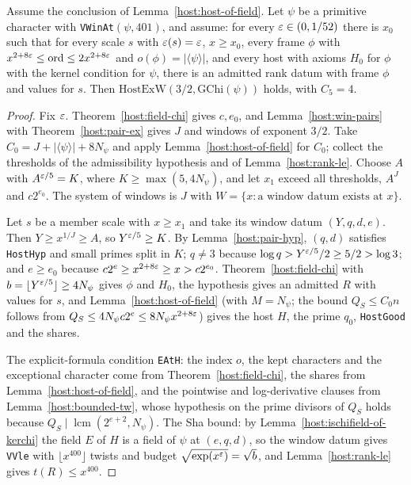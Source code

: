 \begin{theorem}\label{host:supply-of-adm-of}
Assume the conclusion of Lemma~\ref{host:host-of-field}. Let $\psi$ be a
primitive character with \texttt{VWinAt}$(\psi,401)$, and assume: for every
$\varepsilon\in(0,1/52)$ there is $x_0$ such that for every scale $s$ with
$\varepsilon(s)=\varepsilon$, $x\ge x_0$, every frame $\phi$ with
$x^{2+8\varepsilon}\le\mathrm{ord}\le2x^{2+8\varepsilon}$ and $o(\phi)=|\langle\psi
\rangle|$, and every host with axioms $H_0$ for $\phi$ with the kernel
condition for $\psi$, there is an admitted rank datum with frame $\phi$ and
values for $s$. Then $\mathrm{HostExW}(3/2,\mathrm{GChi}(\psi))$ holds, with
$C_5=4$.
\end{theorem}
\begin{proof}
Fix $\varepsilon$. Theorem~\ref{host:field-chi} gives $c,e_0$, and
Lemma~\ref{host:win-pairs} with Theorem~\ref{host:pair-ex} gives $J$ and
windows of exponent $3/2$. Take $C_0=J+|\langle\psi\rangle|+8N_{\psi}$ and
apply Lemma~\ref{host:host-of-field} for $C_0$; collect the thresholds of
the admissibility hypothesis and of Lemma~\ref{host:rank-le}. Choose
$A$ with $A^{\varepsilon/5}=K$, where $K\ge\max(5,4N_{\psi})$, and let $x_1$ exceed
all thresholds, $A^J$ and $c2^{e_0}$. The system of windows is $J$ with
$W=\{x:\text{a window datum exists at }x\}$.

Let $s$ be a member scale with $x\ge x_1$ and take its window datum
$(Y,q,d,e)$. Then $Y\ge x^{1/J}\ge A$, so $Y^{\varepsilon/5}\ge K$. By
Lemma~\ref{host:pair-hyp}, $(q,d)$ satisfies \texttt{HostHyp} and small
primes split in $K$; $q\ne3$ because $\log q>Y^{\varepsilon/5}/2\ge5/2>\log3$;
and $e\ge e_0$ because $c2^e\ge x^{2+8\varepsilon}\ge x>c2^{e_0}$.
Theorem~\ref{host:field-chi} with $b=\lfloor Y^{\varepsilon/5}\rfloor\ge4N_{\psi}$
gives $\phi$ and $H_0$, the hypothesis gives an admitted $R$ with values
for $s$, and Lemma~\ref{host:host-of-field} (with $M=N_{\psi}$; the bound
$Q_S\le C_0n$ follows from $Q_S\le4N_{\psi} c2^e\le8N_{\psi} x^{2+8\varepsilon}$)
gives the host $H$, the prime $q_0$, \texttt{HostGood} and the shares.

The explicit-formula condition \texttt{EAtH}: the index $o$, the kept
characters and the exceptional character come from
Theorem~\ref{host:field-chi}, the shares from
Lemma~\ref{host:host-of-field}, and the pointwise and log-derivative
clauses from Lemma~\ref{host:bounded-tw}, whose hypothesis on the prime
divisors of $Q_S$ holds because $Q_S\mid\operatorname{lcm}(2^{e+2},
N_{\psi})$. The Sha bound: by Lemma~\ref{host:ischifield-of-kerchi} the field
$E$ of $H$ is a field of $\psi$ at $(e,q,d)$, so the window datum gives
\texttt{VVle} with $\lfloor x^{400}\rfloor$ twists and budget
$\sqrt{\exp(x^{\varepsilon})}=\sqrt b$, and Lemma~\ref{host:rank-le} gives
$t(R)\le x^{400}$.
\end{proof}

